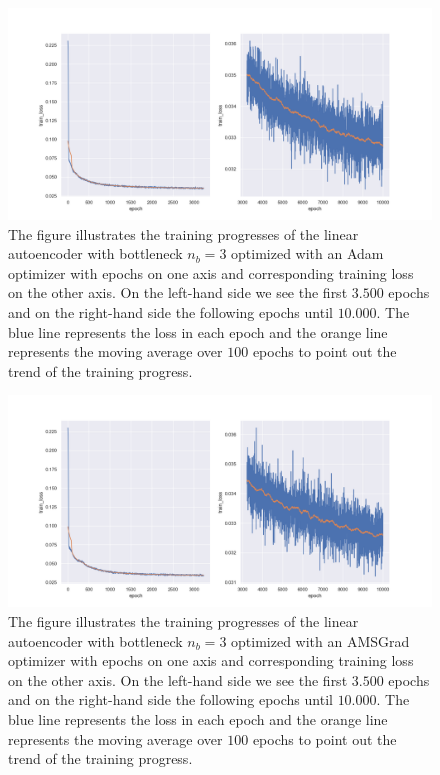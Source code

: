 \begin{figure}
\begin{center}
\includegraphics[width=\linewidth]{linear_AE_3d_adam_training_progress}
\end{center}
\caption{The figure illustrates the training progresses of the linear autoencoder with bottleneck $n_b=3$ optimized with an Adam optimizer with epochs on one axis and corresponding training loss on the other axis. On the left-hand side we see the first $3.500$ epochs and on the right-hand side the following epochs until $10.000$. The blue line represents the loss in each epoch and the orange line represents the moving average over $100$ epochs to point out the trend of the training progress.}\label{fig:linear_AE_3d_adam_training_progress}
\end{figure}


\begin{figure}
\begin{center}
\includegraphics[width=\linewidth]{linear_AE_3d_amsgrad_training_progress}
\end{center}
\caption{The figure illustrates the training progresses of the linear autoencoder with bottleneck $n_b=3$ optimized with an AMSGrad optimizer with epochs on one axis and corresponding training loss on the other axis. On the left-hand side we see the first $3.500$ epochs and on the right-hand side the following epochs until $10.000$. The blue line represents the loss in each epoch and the orange line represents the moving average over $100$ epochs to point out the trend of the training progress.}\label{fig:linear_AE_3d_amsgrad_training_progress}
\end{figure}


